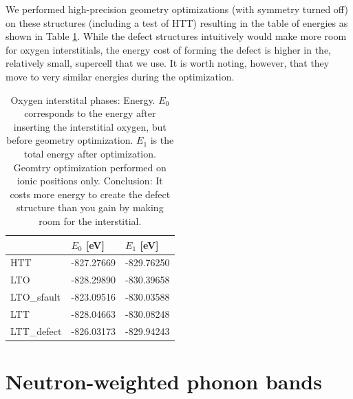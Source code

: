 We performed high-precision geometry optimizations (with symmetry turned off) on these structures (including a test of HTT) resulting in the table of energies as shown in Table \ref{tab:oint_en}. While the defect structures intuitively would make more room for oxygen interstitials, the energy cost of forming the defect is higher in the, relatively small, supercell that we use. It is worth noting, however, that they move to very similar energies during the optimization.


\begin{table}[b]
    \centering
    \begin{tabular}{@{}lll@{}}
    \toprule
     & $E_0$ [eV] & $E_1$ [eV]            \\ \midrule
    HTT                     & -827.27669             & -829.76250 \\
    LTO                     & -828.29890             & -830.39658 \\
    LTO\_sfault              & -823.09516             & -830.03588 \\
    LTT                     & -828.04663             & -830.08248 \\
    LTT\_defect              & -826.03173             & -829.94243 \\ \bottomrule
    \end{tabular}
    \caption[Oxygen interstital phases: Energy]{Oxygen interstital phases: Energy. $E_0$ corresponds to the energy after inserting the interstitial oxygen, but before geometry optimization. $E_1$ is the total energy after optimization. Geomtry optimization performed on ionic positions only. Conclusion: It costs more energy to create the defect structure than you gain by making room for the interstitial.}
    \label{tab:oint_en}
\end{table}

\section{Neutron-weighted phonon bands}

